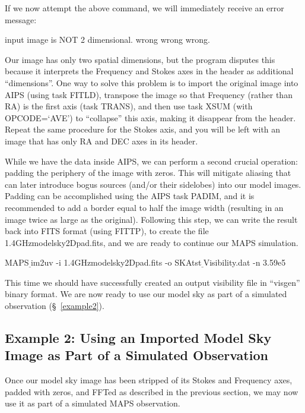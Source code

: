 \documentclass[12pt,psfig]{article}
\begin{document}
If we now attempt the above command, we will immediately receive
an error message: 

\bigskip

\noindent{\tiny \%} input image is NOT 2 dimensional. wrong wrong wrong.

\bigskip

\noindent Our image has only two spatial dimensions, but the
program disputes this because it interprets the Frequency and Stokes
axes in the header as additional ``dimensions''. One
way to solve this problem is to import the original image into AIPS 
(using task {\sf FITLD}), transpose
the image so that Frequency (rather than RA) is the 
first axis (task {\sf TRANS}), and then use task {\sf XSUM} (with
{\sf OPCODE=`AVE'}) to
``collapse'' this axis, making it disappear from the header.
Repeat the same procedure for the Stokes axis, and you will be left
with an image that has only RA and DEC axes in its header. 

While we have the data inside AIPS, we can perform a
second crucial operation: padding the periphery of the image with 
zeros. This will 
mitigate aliasing
that can later introduce bogus sources (and/or their sidelobes) into
our model images. Padding can be  accomplished using the AIPS task {\sf PADIM},
and it is recommended to add a border equal to half the image
width (resulting in an image twice as large as the original). 
Following this step, we can
write the result back into FITS format (using {\sf FITTP}), to create
the file
{\sf 1.4GHzmodelsky2Dpad.fits}, and we are
ready to continue our MAPS simulation.

\bigskip

\noindent{\tiny\%} MAPS$\underline~$im2uv -i 1.4GHzmodelsky2Dpad.fits -o
SKAtst$\underline~$Visibility.dat -n 3.59e5

\bigskip

\noindent This time we should have successfully created an output
visibility file in ``visgen'' binary format. 
We are now ready to use our model sky
as part of a simulated observation (\S~\ref{example2}).

\subsection{Example 2: Using an Imported Model Sky Image as Part of a
Simulated Observation\protect\label{example2}}
%
Once our model sky image has been stripped of its 
Stokes and Frequency axes, padded
with zeros, and FFTed as described in the previous section, we may
now use it as part of a simulated MAPS observation. 
\end{document}
